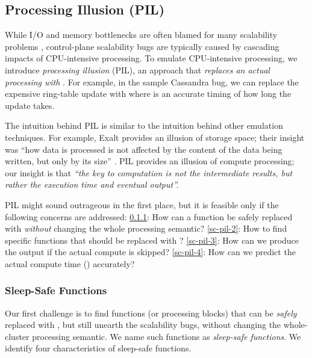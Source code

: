 

\subsection{Processing Illusion (PIL)}
\label{sc-pil}

While I/O and memory bottlenecks are often blamed for many scalability problems
\cite{Ousterhout+15-MakingSense,Konstantin+10-HDFSScalability, Wang+14-Exalt},
control-plane scalability bugs are typically caused by cascading impacts of
CPU-intensive processing.
%
To emulate CPU-intensive processing, we introduce {\em processing illusion}
(PIL), an approach that {\em replaces an actual processing with \sleep}.  For
example, in the sample Cassandra bug, we can replace the expensive ring-table
update with  where  is an accurate timing of how long the
update takes.


The intuition behind PIL is similar to the intuition behind other
emulation techniques.
%
For example, Exalt provides an illusion of storage space; their insight
was ``how data is processed is  not affected by the content of the data
being written, but only by its size'' \cite{Wang+14-Exalt}.
%
PIL provides an illusion of compute processing; our insight is that
{\em ``the
  key to computation is not the intermediate results, but rather the
  execution time and eventual output''.}
%

PIL might sound outrageous in the first place, but it is feasible only if 
the following concerns are addressed:
%
%
\sec\ref{sc-pil-1}: How can a function be safely replaced
with \sleep \textit{without} changing the whole processing semantic?
%
\sec\ref{sc-pil-2}:
How to find specific functions that should be replaced with \sleep?
%
\sec\ref{sc-pil-3}: How can we produce the output if the actual compute is
skipped?
%
\sec\ref{sc-pil-4}: How can we predict the actual compute time ()
accurately?




\subsubsection{Sleep-Safe Functions}
\label{sc-pil-1}


Our first challenge is to find functions (or processing blocks) that can
be {\em safely} replaced with \sleep, but still unearth the scalability
bugs, without changing the whole-cluster processing semantic.
%
We name such functions as {\em sleep-safe functions}.  
%
We identify four characteristics of sleep-safe functions.

